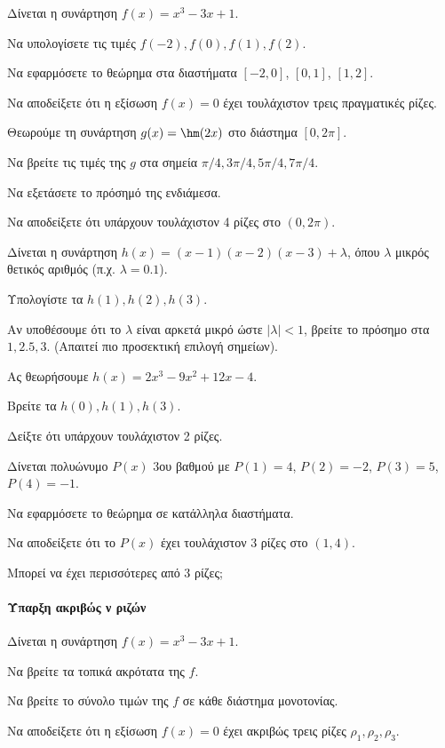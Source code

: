 \documentclass[11pt,a4paper,modern]{FFExercises}
\begin{document}
\askhsh
Δίνεται η συνάρτηση $f(x) = x^3 - 3x + 1$.
\begin{alist}
    \item Να υπολογίσετε τις τιμές $f(-2), f(0), f(1), f(2)$.
    \item Να εφαρμόσετε το θεώρημα  στα διαστήματα $[-2, 0]$, $[0, 1]$, $[1, 2]$.
    \item Να αποδείξετε ότι η εξίσωση $f(x)=0$ έχει τουλάχιστον τρεις πραγματικές ρίζες.
\end{alist}

\askhsh
Θεωρούμε τη συνάρτηση $g(x) = \hm(2x)$ στο διάστημα $[0, 2\pi]$.
\begin{alist}
    \item Να βρείτε τις τιμές της $g$ στα σημεία $\pi/4, 3\pi/4, 5\pi/4, 7\pi/4$.
    \item Να εξετάσετε το πρόσημό της ενδιάμεσα.
    \item Να αποδείξετε ότι υπάρχουν τουλάχιστον 4 ρίζες στο $(0, 2\pi)$.
\end{alist}

\askhsh
Δίνεται η συνάρτηση $h(x) = (x-1)(x-2)(x-3) + \lambda$, όπου $\lambda$ μικρός θετικός αριθμός (π.χ. $\lambda=0.1$).
\begin{alist}
    \item Υπολογίστε τα $h(1), h(2), h(3)$.
    \item Αν υποθέσουμε ότι το $\lambda$ είναι αρκετά μικρό ώστε $| \lambda | < 1$, βρείτε το πρόσημο στα $1, 2.5, 3$. (Απαιτεί πιο προσεκτική επιλογή σημείων).
    \item Ας θεωρήσουμε $h(x) = 2x^3 - 9x^2 + 12x - 4$.
    \item Βρείτε τα $h(0), h(1), h(3)$.
    \item Δείξτε ότι υπάρχουν τουλάχιστον 2 ρίζες.
\end{alist}

\askhsh
Δίνεται πολυώνυμο $P(x)$ 3ου βαθμού με $P(1)=4$, $P(2)=-2$, $P(3)=5$, $P(4)=-1$.
\begin{alist}
    \item Να εφαρμόσετε το θεώρημα  σε κατάλληλα διαστήματα.
    \item Να αποδείξετε ότι το $P(x)$ έχει τουλάχιστον 3 ρίζες στο $(1, 4)$.
    \item Μπορεί να έχει περισσότερες από 3 ρίζες;
\end{alist}
\paragraph{Ύπαρξη ακριβώς ν ριζών}
\askhsh
Δίνεται η συνάρτηση $f(x)=x^3-3x+1$.
\begin{alist}
    \item Να βρείτε τα τοπικά ακρότατα της $f$.
    \item Να βρείτε το σύνολο τιμών της $f$ σε κάθε διάστημα μονοτονίας.
    \item Να αποδείξετε ότι η εξίσωση $f(x)=0$ έχει ακριβώς τρεις ρίζες $\rho_1, \rho_2, \rho_3$.
\end{alist}
\end{document}
